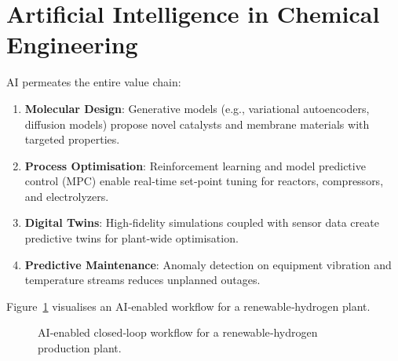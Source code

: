 \documentclass[conference]{IEEEtran}
\begin{document}
\section{Artificial Intelligence in Chemical Engineering}
AI permeates the entire value chain:
\begin{enumerate}
  \item \textbf{Molecular Design}: Generative models (e.g., variational autoencoders, diffusion models) propose novel catalysts and membrane materials with targeted properties.
  \item \textbf{Process Optimisation}: Reinforcement learning and model predictive control (MPC) enable real‑time set‑point tuning for reactors, compressors, and electrolyzers.
  \item \textbf{Digital Twins}: High‑fidelity simulations coupled with sensor data create predictive twins for plant‑wide optimisation.
  \item \textbf{Predictive Maintenance}: Anomaly detection on equipment vibration and temperature streams reduces unplanned outages.
\end{enumerate}

Figure~\ref{fig:ai_workflow} visualises an AI‑enabled workflow for a renewable‑hydrogen plant.

\begin{figure}[!t]
\centering
{}
\caption{AI‑enabled closed‑loop workflow for a renewable‑hydrogen production plant.}
\label{fig:ai_workflow}
\end{figure}
\end{document}
